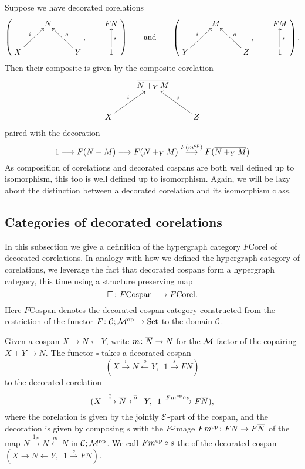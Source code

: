 Suppose we have decorated corelations
\[
  \left(
  \begin{aligned}
    \xymatrix{
      & N \\  
      X \ar[ur]^{i} && Y \ar[ul]_{o}
    }
  \end{aligned}
  ,
  \qquad
  \begin{aligned}
    \xymatrix{
      FN \\
      1 \ar[u]_{s}
    }
  \end{aligned}
  \right)
  \qquad
  \mbox{and}
  \qquad
  \left(
  \begin{aligned}
    \xymatrix{
      & M \\  
      Y \ar[ur]^{i} && Z \ar[ul]_{o}
    }
  \end{aligned}
  ,
  \qquad
  \begin{aligned}
    \xymatrix{
      FM \\
      1 \ar[u]_{s}
    }
  \end{aligned}
  \right).
\]
Then their composite is given by the composite corelation
\[
  \xymatrix{
    & \overline{N+_YM} \\  
    X \ar[ur]^{i} && Z \ar[ul]_{o}
  }
\]
paired with the decoration
\[
  1 \longrightarrow F(N+M) \longrightarrow F(N+_YM) \stackrel{F(m^{\mathrm{op}})}\longrightarrow F(\overline{N+_YM})
\]
As composition of corelations and decorated cospans are both well defined up to
isomorphism, this too is well defined up to isomorphism. Again, we will be lazy
about the distinction between a decorated corelation and its isomorphism class.


\subsection{Categories of decorated corelations}
In this subsection we give a definition of the hypergraph category
$F\mathrm{Corel}$ of decorated corelations.  In analogy with how we defined the
hypergraph category of corelations, we leverage the fact that decorated cospans
form a hypergraph category, this time using a structure preserving map 
\[
  \square{\colon} F\mathrm{Cospan} \longrightarrow F\mathrm{Corel}.
\]
Here $F\mathrm{Cospan}$ denotes the decorated cospan category constructed from
the restriction of the functor $F{\colon} \mathcal C;\mathcal M^{\mathrm{op}} \to \mathrm{Set}$ to the domain
$\mathcal C$. 

Given a cospan $X \to N \leftarrow Y$, write $m{\colon} \overline{N} \to N$ for the
$\mathcal M$ factor of the copairing $X+Y \to N$. The functor $\square$ takes a
decorated cospan 
\[
  (X \stackrel{i}\longrightarrow N \stackrel{o}\longleftarrow Y, \enspace 1
    \stackrel{s}\longrightarrow FN)
\]
to the decorated corelation 
\[
  (X \stackrel{\overline{i}}\longrightarrow \overline N
  \stackrel{\overline{o}}{\longleftarrow} Y, \enspace 1 \xrightarrow{Fm^{\mathrm{op}} \circ
  s} F\overline{N}),
\]
where the corelation is given by the jointly $\mathcal E$-part of the cospan, and the
decoration is given by composing $s$ with the $F$-image $Fm^{\mathrm{op}}{\colon} FN \to
F\overline{N}$ of the map $N \stackrel{1_N}\to N \stackrel{m}\leftarrow
\overline{N}$ in $\mathcal C;\mathcal M^{\mathrm{op}}$. We call $Fm^{\mathrm{op}} \circ s$ the
 of the decorated cospan $(X \to N \leftarrow Y,
\enspace 1 \stackrel{s}\to FN)$.

